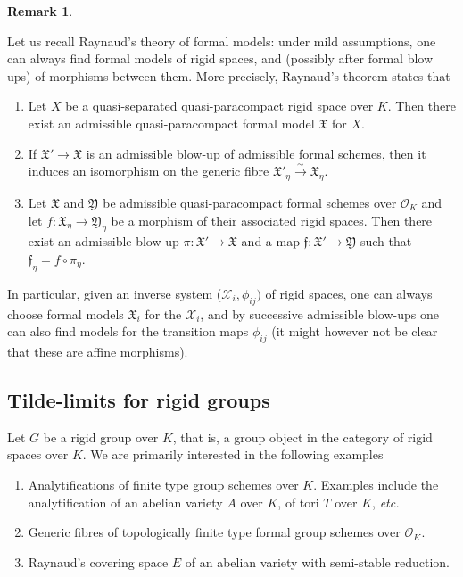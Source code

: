 \documentclass[10pt,oneside]{amsart}
\theoremstyle{definition}
\newtheorem{remark}[theorem]{Remark}
\begin{document}
 	\begin{remark} \label{Raynaud theory main theorem}
			
	Let us recall Raynaud's theory of formal models: under mild assumptions,
	one can always find formal models of rigid spaces, and (possibly after formal blow ups) of morphisms between them. More precisely, Raynaud's theorem \cite[section 8.4]{Bosch lectures} states that
		
		\begin{enumerate}
			\item Let $X$ be a quasi-separated quasi-paracompact rigid space over $K$. Then there exist an admissible quasi-paracompact formal model $\mathfrak X$ for $X$.
			\item If $\mathfrak X'\rightarrow \mathfrak X$ is an admissible blow-up of admissible formal schemes, then it induces an isomorphism on the generic fibre  $\mathfrak X'_\eta \xrightarrow{\sim} \mathfrak X_\eta$.
			\item Let $\mathfrak X$ and $\mathfrak Y$ be admissible quasi-paracompact formal schemes over $\mathcal O_K$ and let $f:\mathfrak X_\eta \rightarrow \mathfrak Y_\eta$ be a morphism of their associated rigid spaces. Then there exist an admissible blow-up $\pi:\mathfrak X'\rightarrow \mathfrak X$ and a map $\mathfrak f:\mathfrak X'\rightarrow \mathfrak Y$ such that $\mathfrak f_\eta = f\circ \pi_\eta$.
		\end{enumerate}
		In particular, given an inverse system ($\mathcal X_i,\phi_{ij})$ of rigid spaces, one can always choose formal models $\mathfrak X_i$ for the $\mathcal X_i$, and by successive admissible blow-ups one can also find models for the transition maps $\phi_{ij}$ (it might however not be clear that these are affine morphisms). 
		\end{remark}

	
\subsection{Tilde-limits for rigid groups}

Let $G$ be a rigid group over $K$, that is, a group object in the category of rigid spaces over $K$.
	We are primarily interested in the following examples 
\begin{enumerate}	 
\item Analytifications of finite type group schemes over $K$. Examples include the analytification of an abelian variety $A$ over $K$, of tori $T$ over $K$, \textit{\small etc.}
\item Generic fibres of topologically finite type formal group schemes over $\mathcal O_K$. 
\item Raynaud's covering space $E$  of an abelian variety with semi-stable reduction.
\end{enumerate}
\end{document}
